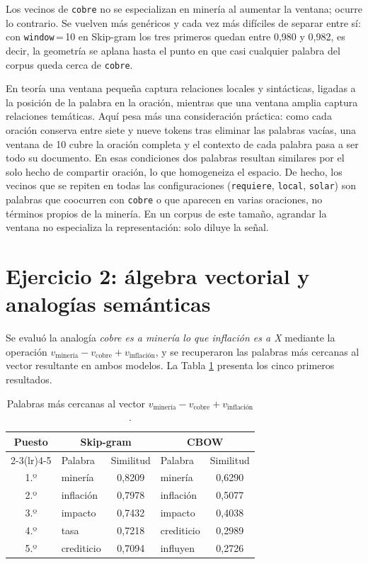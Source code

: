 \documentclass[12pt, a4paper]{article}
\newcommand{\code}[1]{\texttt{#1}}
\begin{document}
Los vecinos de \code{cobre} no se especializan en minería al aumentar la ventana; ocurre lo
contrario. Se vuelven más genéricos y cada vez más difíciles de separar entre sí: con
\code{window}\,=\,10 en Skip-gram los tres primeros quedan entre 0,980 y 0,982, es decir, la
geometría se aplana hasta el punto en que casi cualquier palabra del corpus queda cerca de
\code{cobre}.

En teoría una ventana pequeña captura relaciones locales y sintácticas, ligadas a la posición de la
palabra en la oración, mientras que una ventana amplia captura relaciones temáticas. Aquí pesa más
una consideración práctica: como cada oración conserva entre siete y nueve tokens tras eliminar las
palabras vacías, una ventana de 10 cubre la oración completa y el contexto de cada palabra pasa a ser
todo su documento. En esas condiciones dos palabras resultan similares por el solo hecho de compartir
oración, lo que homogeneiza el espacio. De hecho, los vecinos que se repiten en todas las
configuraciones (\code{requiere}, \code{local}, \code{solar}) son palabras que coocurren con
\code{cobre} o que aparecen en varias oraciones, no términos propios de la minería. En un corpus de
este tamaño, agrandar la ventana no especializa la representación: solo diluye la señal.

\section{Ejercicio 2: álgebra vectorial y analogías semánticas}

Se evaluó la analogía \textit{cobre es a minería lo que inflación es a X} mediante la operación
$v_{\text{minería}} - v_{\text{cobre}} + v_{\text{inflación}}$, y se recuperaron las palabras más
cercanas al vector resultante en ambos modelos. La Tabla \ref{tab:analogia} presenta los cinco
primeros resultados.

\begin{table}[H]
\centering
\caption{Palabras más cercanas al vector $v_{\text{minería}} - v_{\text{cobre}} + v_{\text{inflación}}$.}
\label{tab:analogia}
\small
\renewcommand{\arraystretch}{1.2}
\begin{tabular}{@{}clclc@{}}
\toprule
\textbf{Puesto} & \multicolumn{2}{c}{\textbf{Skip-gram}} & \multicolumn{2}{c}{\textbf{CBOW}} \\
\cmidrule(lr){2-3}\cmidrule(lr){4-5}
 & Palabra & Similitud & Palabra & Similitud \\
\midrule
1.º & minería    & 0,8209 & minería    & 0,6290 \\
2.º & inflación  & 0,7978 & inflación  & 0,5077 \\
3.º & impacto    & 0,7432 & impacto    & 0,4038 \\
4.º & tasa       & 0,7218 & crediticio & 0,2989 \\
5.º & crediticio & 0,7094 & influyen   & 0,2726 \\
\bottomrule
\end{tabular}
\end{table}
\end{document}
